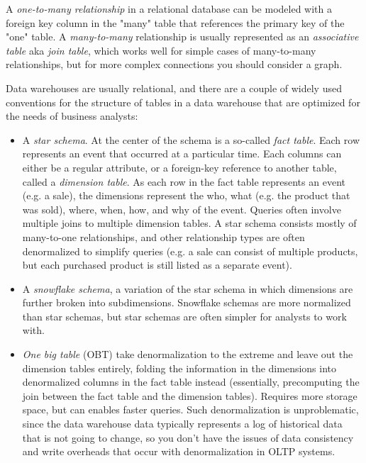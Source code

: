\documentclass[table, xcdraw]{article}%
\begin{document}
A \textit{one-to-many relationship} in a relational database can be modeled with a foreign key column in the "many" table that references the primary key of the "one" table. A \textit{many-to-many} relationship is usually represented as an \textit{associative table} aka \textit{join table}, which works well for simple cases of many-to-many relationships, but for more complex connections you should consider a graph.

Data warehouses are usually relational, and there are a couple of widely used conventions for the structure of tables in a data warehouse that are optimized for the needs of business analysts:

\begin{itemize}
    \item A \textit{star schema}. At the center of the schema is a so-called \textit{fact table}. Each row represents an event that occurred at a particular time. Each columns can either be a regular attribute, or a foreign-key reference to another table, called a \textit{dimension table}. As each row in the fact table represents an event (e.g. a sale), the dimensions represent the who, what (e.g. the product that was sold), where, when, how, and why of the event. Queries often involve multiple joins to multiple dimension tables. A star schema consists mostly of many-to-one relationships, and other relationship types are often denormalized to simplify queries (e.g. a sale can consist of multiple products, but each purchased product is still listed as a separate event).
    \item A \textit{snowflake schema}, a variation of the star schema in which dimensions are further broken into subdimensions. Snowflake schemas are more normalized than star schemas, but star schemas are often simpler for analysts to work with.
    \item \textit{One big table} (OBT) take denormalization to the extreme and leave out the dimension tables entirely, folding the information in the dimensions into denormalized columns in the fact table instead (essentially, precomputing the join between the fact table and the dimension tables). Requires more storage space, but can enables faster queries. Such denormalization is unproblematic, since the data warehouse data typically represents a log of historical data that is not going to change, so you don't have the issues of data consistency and write overheads that occur with denormalization in OLTP systems. 
\end{itemize}
\end{document}
